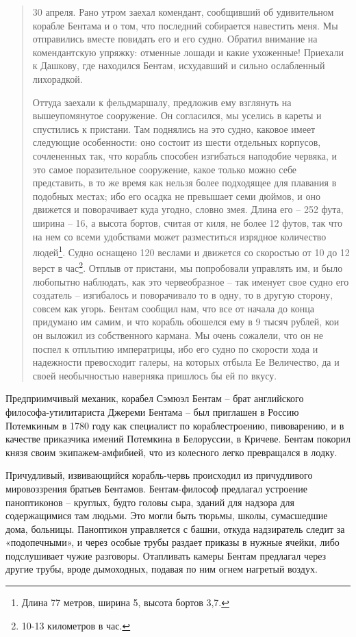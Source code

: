 \begin{quotation}
30 апреля. Рано утром заехал комендант, сообщивший об удивительном корабле Бентама и о том, что последний собирается навестить меня. Мы отправились вместе повидать его и его судно. Обратил внимание на комендантскую упряжку: отменные лошади и какие ухоженные! Приехали к Дашкову, где находился Бентам, исхудавший и сильно ослабленный лихорадкой.

Оттуда заехали к фельдмаршалу, предложив ему взглянуть на вышеупомянутое сооружение. Он согласился, мы уселись в кареты и спустились к пристани. Там поднялись на это судно, каковое имеет следующие особенности: оно состоит из шести отдельных корпусов, сочлененных так, что корабль способен изгибаться наподобие червяка, и это самое поразительное сооружение, какое только можно себе представить, в то же время как нельзя более подходящее для плавания в подобных местах; ибо его осадка не превышает семи дюймов, и оно движется и поворачивает куда угодно, словно змея. Длина его – 252 фута, ширина – 16, а высота бортов, считая от киля, не более 12 футов, так что на нем со всеми удобствами может разместиться изрядное количество людей\footnote{Длина 77 метров, ширина 5, высота бортов 3,7.}. Судно оснащено 120 веслами и движется со скоростью от 10 до 12 верст в час\footnote{10-13 километров в час.}. Отплыв от пристани, мы попробовали управлять им, и было любопытно наблюдать, как это червеобразное – так именует свое судно его создатель – изгибалось и поворачивало то в одну, то в другую сторону, совсем как угорь. Бентам сообщил нам, что все от начала до конца придумано им самим, и что корабль обошелся ему в 9 тысяч рублей, кои он выложил из собственного кармана. Мы очень сожалели, что он не поспел к отплытию императрицы, ибо его судно по скорости хода и надежности превосходит галеры, на которых отбыла Ее Величество, да и своей необычностью наверняка пришлось бы ей по вкусу.
\end{quotation}

Предприимчивый механик, корабел Сэмюэл Бентам – брат английского философа-утилитариста Джереми Бентама – был приглашен в Россию Потемкиным в 1780 году как специалист по кораблестроению, пивоварению, и в качестве приказчика имений Потемкина в Белоруссии, в Кричеве. Бентам покорил князя своим экипажем-амфибией, что из колесного легко превращался в лодку.

Причудливый, извивающийся корабль-червь происходил из причудливого мировоззрения братьев Бентамов. Бентам-философ предлагал устроение паноптиконов – круглых, будто головы сыра, зданий для надзора для содержащимися там людьми. Это могли быть тюрьмы, школы, сумасшедшие дома, больницы. Паноптикон управляется с башни, откуда надзиратель следит за «подопечными», и через особые трубы раздает приказы в нужные ячейки, либо подслушивает чужие разговоры. Отапливать камеры Бентам предлагал через другие трубы, вроде дымоходных, подавая по ним огнем нагретый воздух.

